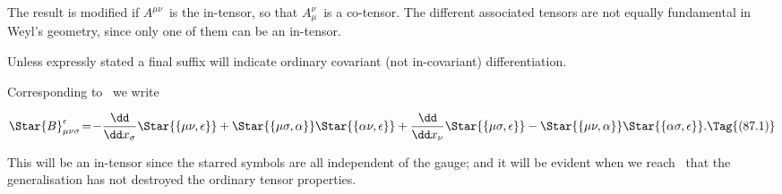 \documentclass[12pt]{book}
\begin{document}
The result is modified if $A^{\mu\nu}$~is the in\hyp{}tensor, so that $A_{\mu}^{\nu}$~is a co\hyp{}tensor. The
different associated tensors are not equally fundamental in Weyl's geometry,
since only one of them can be an in\hyp{}tensor.

Unless expressly stated a final suffix will indicate ordinary covariant (not
in\hyp{}covariant) differentiation.

%

Corresponding to~ we write

\[
\Star{B}_{\mu\nu\sigma}^{\epsilon}
\!=\! -\frac{\dd}{\dd x_{\sigma}} \Star{\{\mu\nu, \epsilon\}}
  + \Star{\{\mu\sigma, \alpha\}} \Star{\{\alpha\nu, \epsilon\}}
  + \frac{\dd}{\dd x_{\nu}} \Star{\{\mu\sigma, \epsilon\}}
  - \Star{\{\mu\nu, \alpha\}} \Star{\{\alpha\sigma, \epsilon\}}.
  \Tag{(87.1)}
\]

This will be an in\hyp{}tensor since the starred symbols are all independent of
the gauge; and it will be evident when we reach~ that the generalisation
has not destroyed the ordinary tensor properties.
\end{document}
